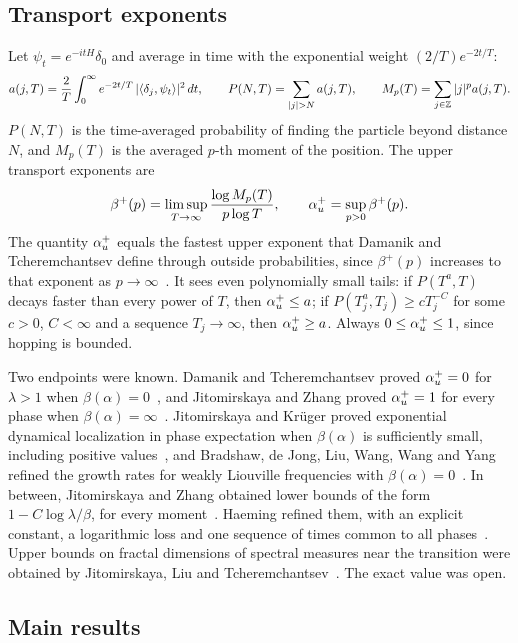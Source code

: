 \subsection{Transport exponents}

Let $\psi_t=e^{-itH}\delta_0$ and average in time with the exponential weight $(2/T)e^{-2t/T}$:
\begin{equation}\label{eq:abel}
a(j,T)=\frac2T\int_0^\infty e^{-2t/T}\,|\langle\delta_j,\psi_t\rangle|^2\,dt,\qquad
P(N,T)=\sum_{|j|>N}a(j,T),\qquad M_p(T)=\sum_{j\in\Z}|j|^p a(j,T).
\end{equation}
$P(N,T)$ is the time-averaged probability of finding the particle beyond distance $N$, and $M_p(T)$ is the averaged $p$-th moment of the position. The upper transport exponents are
\begin{equation}\label{eq:exponents}
\beta^+(p)=\limsup_{T\to\infty}\frac{\log M_p(T)}{p\log T},\qquad
\alpha_u^+=\sup_{p>0}\beta^+(p).
\end{equation}
The quantity $\alpha_u^+$ equals the fastest upper exponent that Damanik and Tcheremchantsev define through outside probabilities, since $\beta^+(p)$ increases to that exponent as $p\to\infty$~\cite[Section~2, equation~(10) and the display before it]{DT2007}. It sees even polynomially small tails: if $P(T^a,T)$ decays faster than every power of $T$, then $\alpha_u^+\le a$; if $P(T_j^a,T_j)\ge cT_j^{-C}$ for some $c>0$, $C<\infty$ and a sequence $T_j\to\infty$, then $\alpha_u^+\ge a$. Always $0\le\alpha_u^+\le1$, since hopping is bounded.

Two endpoints were known. Damanik and Tcheremchantsev proved $\alpha_u^+=0$ for $\lambda>1$ when $\beta(\alpha)=0$~\cite{DT2007}, and Jitomirskaya and Zhang proved $\alpha_u^+=1$ for every phase when $\beta(\alpha)=\infty$~\cite{JZ2022}. Jitomirskaya and Kr\"uger proved exponential dynamical localization in phase expectation when $\beta(\alpha)$ is sufficiently small, including positive values~\cite{JK2013}, and Bradshaw, de Jong, Liu, Wang, Wang and Yang refined the growth rates for weakly Liouville frequencies with $\beta(\alpha)=0$~\cite{BdJLWWY2025}. In between, Jitomirskaya and Zhang obtained lower bounds of the form $1-C\log\lambda/\beta$, for every moment~\cite{JZ2022}. Haeming refined them, with an explicit constant, a logarithmic loss and one sequence of times common to all phases~\cite{Haeming2025}. Upper bounds on fractal dimensions of spectral measures near the transition were obtained by Jitomirskaya, Liu and Tcheremchantsev~\cite{JLT2025}. The exact value was open.

\subsection{Main results}

